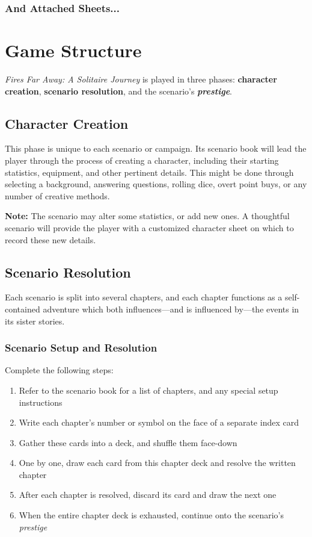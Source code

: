\documentclass[12pt]{article}
\begin{document}
\begin{multicols*}{2}
\newpage

\renewcommand*\contentsname{Table of Contents}
\tableofcontents
\subsubsection*{And Attached Sheets...}
\vfill

\pagebreak

\section{Game Structure}
\emph{Fires Far Away: A Solitaire Journey} is played in three phases: \textbf{character creation}, \textbf{scenario resolution}, and the scenario’s \textbf{\emph{prestige}}.

\subsection{Character Creation}
This phase is unique to each scenario or campaign. Its scenario book will lead the player through the process of creating a character, including their starting statistics, equipment, and other pertinent details. This might be done through selecting a background, answering questions, rolling dice, overt point buys, or any number of creative methods.
\begin{tcolorbox}
\textbf{Note:} The scenario may alter some statistics, or add new ones. A thoughtful scenario will provide the player with a customized character sheet on which to record these new details.
\end{tcolorbox}

\subsection{Scenario Resolution}
Each scenario is split into several chapters, and each chapter functions as a self-contained adventure which both influences—and is influenced by—the events in its sister stories.

\subsubsection*{Scenario Setup and Resolution}
Complete the following steps:
\begin{enumerate}
\item Refer to the scenario book for a list of chapters, and any special setup instructions
\item Write each chapter’s number or symbol on the face of a separate index card
\item Gather these cards into a deck, and shuffle them face-down
\item One by one, draw each card from this chapter deck and resolve the written chapter
\item After each chapter is resolved, discard its card and draw the next one
\item When the entire chapter deck is exhausted, continue onto the scenario’s \emph{prestige}
\end{enumerate}


\end{multicols*}
\end{document}
